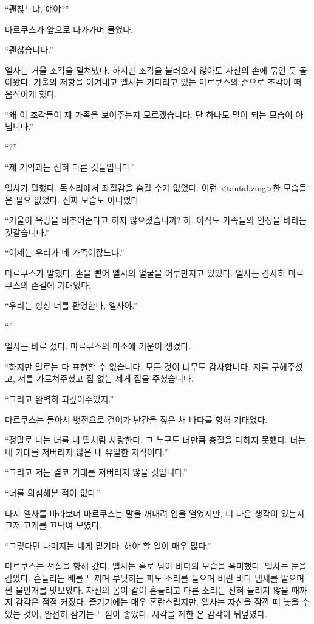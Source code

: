 ``괜찮느냐, 얘야?''

마르쿠스가 앞으로 다가가며 물었다.

``괜찮습니다.''

엘사는 거울 조각을 밀쳐냈다. 하지만 조각을 불러오지 않아도 자신의 손에 묶인 듯 돌아왔다. 거울의 저항을 이겨내고 엘사는 기다리고 있는 마르쿠스의 손으로 조각이 떠 움직이게 했다.

``왜 이 조각들이 제 가족을 보여주는지 모르겠습니다. 단 하나도 말이 되는 모습이 아닙니다.''

``?''

``제 기억과는 전혀 다른 것들입니다.''

엘사가 말했다. 목소리에서 좌절감을 숨길 수가 없었다. 이런 <tantalizing>한 모습들은 필요 없었다. 진짜 모습도 아니었다.

``거울이 욕망을 비추어준다고 하지 않으셨습니까? 하. 아직도 가족들의 인정을 바라는 것같습니다.''

``이제는 우리가 네 가족이잖느냐.''

마르쿠스가 말했다. 손을 뻗어 엘사의 얼굴을 어루만지고 있었다. 엘사는 감사히 마르쿠스의 손길에 기대었다.

``우리는 항상 너를 환영한다, 엘사야.''

``.''

엘사는 바로 섰다. 마르쿠스의 미소에 기운이 생겼다.

``하지만 말로는 다 표현할 수 없습니다. 모든 것이 너무도 감사합니다. 저를 구해주셨고, 저를 가르쳐주셨고 집 없는 제게 집을 주셨습니다. %

``그리고 완벽히 되갚아주었지.'' %

마르쿠스는 돌아서 뱃전으로 걸어가 난간을 짚은 채 바다를 향해 기대었다.

``정말로 나는 너를 내 딸처럼 사랑한다. 그 누구도 너만큼 충절을 다하지 못했다. 너는 내 기대를 저버리지 않은 내 유일한 자식이다.''

``그리고 저는 결코 기대를 저버리지 않을 것입니다.''

`` 너를 의심해본 적이 없다.''

다시 엘사를 바라보며 마르쿠스는 말을 꺼내려 입을 열었지만, 더 나은 생각이 있는지 그저 고개를 끄덕여 보였다.

``그렇다면 나머지는 네게 맡기마. 해야 할 일이 매우 많다.''

마르쿠스는 선실을 향해 갔다. 엘사는 홀로 남아 바다의 모습을 음미했다. 엘사는 눈을 감았다. 흔들리는 배를 느끼며 부딪히는 파도 소리를 들으며 비린 바다 냄새를 맡으며 짠 물안개를 맛보았다. 자신의 몸이 같이 흔들리고 다른 소리는 전혀 들리지 않을 때까지 감각은 점점 커졌다. 즐기기에는 매우 혼란스럽지만, 엘사는 자신을 잠깐 떼 놓을 수 있는 것이, 완전히 잠기는 느낌이 좋았다. 시각을 제한 온 감각이 뒤덮였다. %

